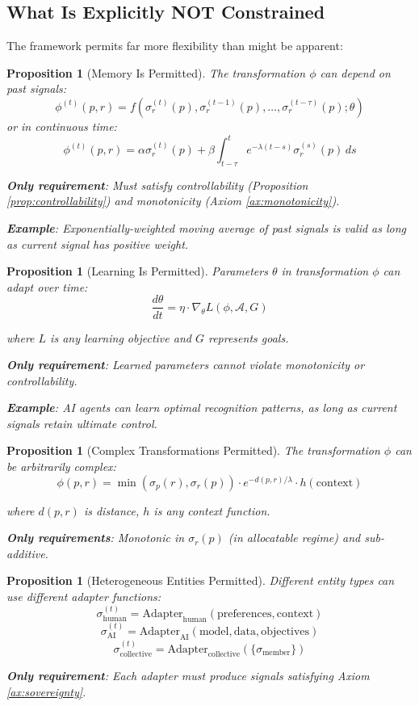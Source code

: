 \documentclass[11pt,a4paper]{article}
\newtheorem{proposition}[theorem]{Proposition}
\theoremstyle{definition}
\theoremstyle{remark}
\newcommand{\A}{\mathcal{A}}
\begin{document}
\subsection{What Is Explicitly NOT Constrained}

The framework permits far more flexibility than might be apparent:

\begin{proposition}[Memory Is Permitted]
\label{prop:memory-permitted}
The transformation $\phi$ can depend on past signals:
\[ \phi^{(t)}(p,r) = f(\sigma_r^{(t)}(p), \sigma_r^{(t-1)}(p), \ldots, \sigma_r^{(t-\tau)}(p); \theta) \]
or in continuous time:
\[ \phi^{(t)}(p,r) = \alpha \sigma_r^{(t)}(p) + \beta \int_{t-\tau}^t e^{-\lambda(t-s)} \sigma_r^{(s)}(p) \, ds \]

\textbf{Only requirement}: Must satisfy controllability (Proposition \ref{prop:controllability}) and monotonicity (Axiom \ref{ax:monotonicity}).

\textbf{Example}: Exponentially-weighted moving average of past signals is valid as long as current signal has positive weight.
\end{proposition}

\begin{proposition}[Learning Is Permitted]
\label{prop:learning-permitted}
Parameters $\theta$ in transformation $\phi$ can adapt over time:
\[ \frac{d\theta}{dt} = \eta \cdot \nabla_\theta L(\phi, \A, G) \]

where $L$ is any learning objective and $G$ represents goals.

\textbf{Only requirement}: Learned parameters cannot violate monotonicity or controllability.

\textbf{Example}: AI agents can learn optimal recognition patterns, as long as current signals retain ultimate control.
\end{proposition}

\begin{proposition}[Complex Transformations Permitted]
\label{prop:complex-transformations}
The transformation $\phi$ can be arbitrarily complex:
\[ \phi(p,r) = \min(\sigma_p(r), \sigma_r(p)) \cdot e^{-d(p,r)/\lambda} \cdot h(\text{context}) \]

where $d(p,r)$ is distance, $h$ is any context function.

\textbf{Only requirements}: Monotonic in $\sigma_r(p)$ (in allocatable regime) and sub-additive.
\end{proposition}

\begin{proposition}[Heterogeneous Entities Permitted]
\label{prop:heterogeneous-entities}
Different entity types can use different adapter functions:
\[ \sigma_{\text{human}}^{(t)} = \text{Adapter}_{\text{human}}(\text{preferences}, \text{context}) \]
\[ \sigma_{\text{AI}}^{(t)} = \text{Adapter}_{\text{AI}}(\text{model}, \text{data}, \text{objectives}) \]
\[ \sigma_{\text{collective}}^{(t)} = \text{Adapter}_{\text{collective}}(\{\sigma_{\text{member}}\}) \]

\textbf{Only requirement}: Each adapter must produce signals satisfying Axiom \ref{ax:sovereignty}.
\end{proposition}
\end{document}
